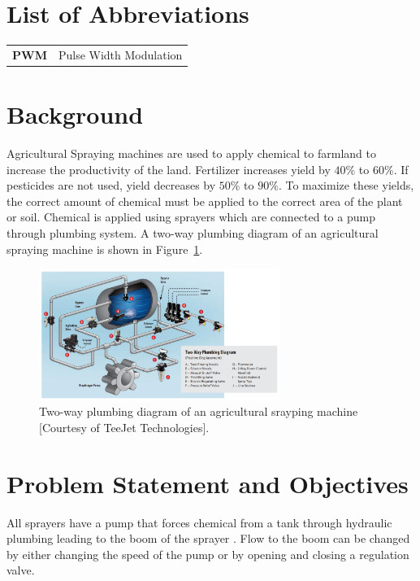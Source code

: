 \section*{List of Abbreviations}
\label{sec:abbreviations}

\begin{tabular}{ll}
  {\bf PWM}& Pulse Width Modulation\\
\end{tabular}
\section{Background}
\label{sec:background}

Agricultural Spraying machines are used to apply chemical to farmland to increase the productivity of the land.  Fertilizer increases yield by $40\%$ to $60\%.$  If pesticides are not used, yield decreases by $50\%$ to $90\%.$  To maximize these yields, the correct amount of chemical must be applied to the correct area of the plant or soil. Chemical is applied using sprayers which are connected to a pump through plumbing system. A two-way plumbing diagram of an agricultural spraying machine is shown in Figure~\ref{fig:twoWayPlumbingDiagramSrayingMachine}.
%
\begin{figure}
  \centering
  \includegraphics[width=0.7\textwidth]{figs/img/twoWayPlumbingDiagramSrayingMachine}
  \caption{Two-way plumbing diagram of an agricultural srayping machine [Courtesy of TeeJet Technologies].}
  \label{fig:twoWayPlumbingDiagramSrayingMachine}
\end{figure}



\section{Problem Statement and Objectives}
\label{sec:probl-stat-object}

All sprayers have a pump that forces chemical from a tank through hydraulic plumbing leading to the boom of the sprayer .  Flow to the boom can be changed by either changing the speed of the pump or by opening and closing a regulation valve.

